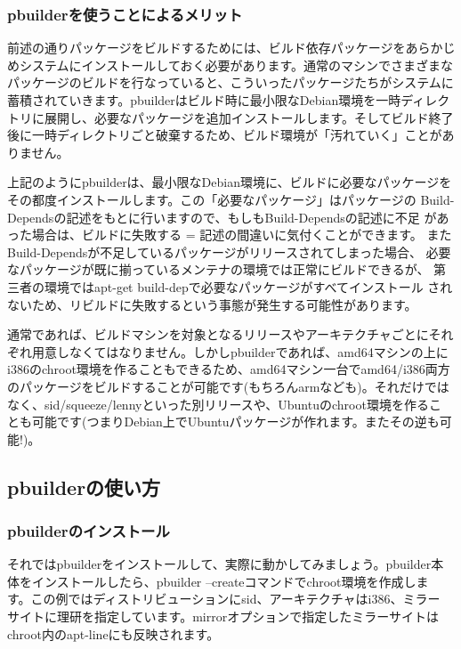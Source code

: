 \documentclass[mingoth,a4paper]{jsarticle}
\begin{document}
\subsubsection{pbuilderを使うことによるメリット}

前述の通りパッケージをビルドするためには、ビルド依存パッケージをあらかじ
めシステムにインストールしておく必要があります。通常のマシンでさまざまな
パッケージのビルドを行なっていると、こういったパッケージたちがシステムに
蓄積されていきます。pbuilderはビルド時に最小限なDebian環境を一時ディレク
トリに展開し、必要なパッケージを追加インストールします。そしてビルド終了
後に一時ディレクトリごと破棄するため、ビルド環境が「汚れていく」ことがあ
りません。

上記のようにpbuilderは、最小限なDebian環境に、ビルドに必要なパッケージを
その都度インストールします。この「必要なパッケージ」はパッケージの
Build-Dependsの記述をもとに行いますので、もしもBuild-Dependsの記述に不足
があった場合は、ビルドに失敗する = 記述の間違いに気付くことができます。
またBuild-Dependsが不足しているパッケージがリリースされてしまった場合、
必要なパッケージが既に揃っているメンテナの環境では正常にビルドできるが、
第三者の環境ではapt-get build-depで必要なパッケージがすべてインストール
されないため、リビルドに失敗するという事態が発生する可能性があります。

通常であれば、ビルドマシンを対象となるリリースやアーキテクチャごとにそれ
ぞれ用意しなくてはなりません。しかしpbuilderであれば、amd64マシンの上に
i386のchroot環境を作ることもできるため、amd64マシン一台でamd64/i386両方
のパッケージをビルドすることが可能です(もちろんarmなども)。それだけでは
なく、sid/squeeze/lennyといった別リリースや、Ubuntuのchroot環境を作るこ
とも可能です(つまりDebian上でUbuntuパッケージが作れます。またその逆も可
能!)。

\subsection{pbuilderの使い方}

\subsubsection{pbuilderのインストール}

それではpbuilderをインストールして、実際に動かしてみましょう。pbuilder本
体をインストールしたら、pbuilder --createコマンドでchroot環境を作成しま
す。この例ではディストリビューションにsid、アーキテクチャはi386、ミラー
サイトに理研を指定しています。mirrorオプションで指定したミラーサイトは
chroot内のapt-lineにも反映されます。
\end{document}

